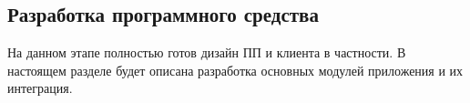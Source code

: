 \subsection{Разработка программного средства}
\label{sec:development:client}

На данном этапе полностью готов дизайн ПП и клиента в частности. В настоящем разделе будет описана разработка основных модулей приложения и их интеграция.




